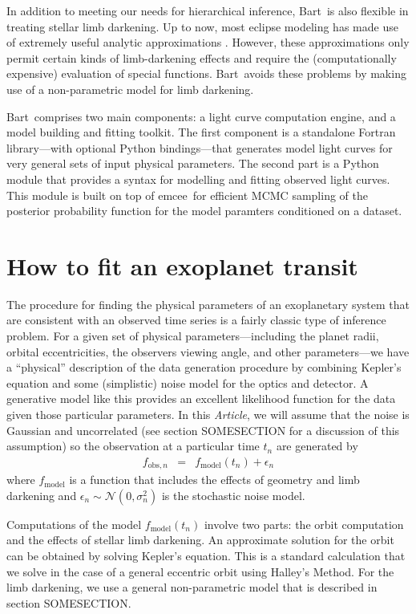 \documentclass[12pt,preprint]{aastex}
\newcommand{\project}[1]{{\sffamily #1}}
\newcommand{\bart}{\project{Bart}}
\newcommand{\emcee}{\project{emcee}}
\newcommand{\paper}{\emph{Article}}
\newcommand{\normal}[1]{\ensuremath{\mathcal{N}(#1)}}
\begin{document}
In addition to meeting our needs for hierarchical inference, \bart\ is
also flexible in treating stellar limb darkening.
Up to now, most eclipse modeling has made use of extremely useful analytic
approximations \citep{mandel}.
However, these approximations only permit certain kinds of limb-darkening
effects and require the (computationally expensive) evaluation of special
functions.
\bart\ avoids these problems by making use of a non-parametric model for limb
darkening.

\bart\ comprises two main components: a light curve computation engine, and a
model building and fitting  toolkit.
The first component is a standalone Fortran library---with optional Python
bindings---that generates model light curves for very general sets of input
physical parameters.
The second part is a Python module that provides a syntax for modelling and
fitting observed light curves.
This module is built on top of \emcee\ for efficient MCMC sampling of the
posterior probability function for the model paramters conditioned on a
dataset.


\section{How to fit an exoplanet transit}

The procedure for finding the physical parameters of an exoplanetary system
that are consistent with an observed time series is a fairly classic type of
inference problem.
For a given set of physical parameters---including the
planet radii, orbital eccentricities, the observers viewing angle, and other
parameters---we have a ``physical'' description of the data generation
procedure by combining Kepler's equation and some (simplistic) noise model for
the optics and detector.
A generative model like this provides an excellent
likelihood function for the data given those particular parameters.
In this \paper, we will assume that the noise is Gaussian and uncorrelated
(see section SOMESECTION for a discussion of this assumption) so the
observation at a particular time $t_n$ are generated by
\begin{eqnarray}
    f_{\mathrm{obs},n} & = & f_\mathrm{model} (t_n) + \epsilon_n
\end{eqnarray}
where $f_\mathrm{model}$ is a function that includes the effects of geometry
and limb darkening and $\epsilon_n \sim \normal{0, \sigma_n^2}$ is the
stochastic noise model.

Computations of the model $f_\mathrm{model} (t_n)$ involve two parts: the
orbit computation and the effects of stellar limb darkening.
An approximate solution for the orbit can be obtained by solving Kepler's
equation.
This is a standard calculation that we solve in the case of a general
eccentric orbit using Halley's Method.
For the limb darkening, we use a general non-parametric model that is
described in section SOMESECTION.
\end{document}
